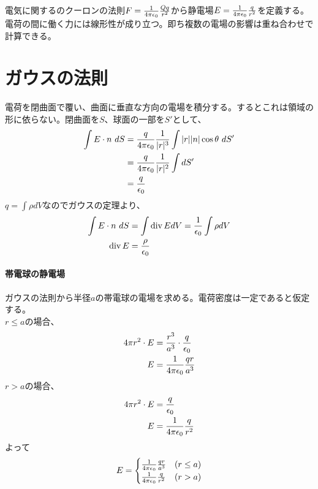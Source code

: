     電気に関するのクーロンの法則$F=\frac{1}{4\pi\epsilon_0}\frac{Qq}{r^2}$から静電場$E=\frac{1}{4\pi\epsilon_0}\frac{q}{r^2}$を定義する。電荷の間に働く力には線形性が成り立つ。即ち複数の電場の影響は重ね合わせで計算できる。
    \section{ガウスの法則}
        電荷を閉曲面で覆い、曲面に垂直な方向の電場を積分する。するとこれは領域の形に依らない。閉曲面を$S$、球面の一部を$S'$として、
        \begin{align*}
            \int E\cdot n\ dS &= \frac{q}{4\pi\epsilon_0}
            \frac{1}{|r|^3}\int |r||n|\cos\theta\ dS'\\
            &= \frac{q}{4\pi\epsilon_0}\frac{1}{|r|^2}\int dS'\\
            &= \frac{q}{\epsilon_0}
        \end{align*}
        $q = \int \rho dV$なのでガウスの定理より、
        \begin{align*}
            \int E\cdot n\ dS &= \int \mathrm{div\,} EdV = 
            \frac{1}{\epsilon_0}\int \rho dV\\
            \mathrm{div\,} E &= \frac{\rho}{\epsilon_0}
        \end{align*}
        \paragraph{帯電球の静電場}
            ガウスの法則から半径$a$の帯電球の電場を求める。電荷密度は一定であると仮定する。\\
            $r \le a$の場合、
            \begin{align*}
                4\pi r^2\cdot E &= \frac{r^3}{a^3}\cdot 
                \frac{q}{\epsilon_0}\\
                E &= \frac{1}{4\pi\epsilon_0}\frac{qr}{a^3}
            \end{align*}
            $r>a$の場合、
            \begin{align*}
                4\pi r^2\cdot E &= \frac{q}{\epsilon_0}\\
                E &= \frac{1}{4\pi\epsilon_0}\frac{q}{r^2}
            \end{align*}
            よって
                \[E = 
                \begin{cases}
                    \frac{1}{4\pi\epsilon_0}\frac{qr}{a^3} & (r \le a)\\
                    \frac{1}{4\pi\epsilon_0}\frac{q}{r^2} & (r>a)
                \end{cases}\]

